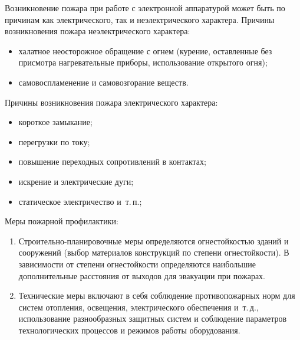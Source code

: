 Возникновение пожара при работе с электронной аппаратурой может быть по причинам как электрического, так и неэлектрического характера.
Причины возникновения пожара неэлектрического характера:
\begin{itemize}
    \item халатное неосторожное обращение с огнем (курение, оставленные без присмотра нагревательные приборы, использование открытого огня);
    \item самовоспламенение и самовозгорание веществ.
\end{itemize}

Причины возникновения пожара электрического характера:
\begin{itemize}
    \item короткое замыкание;
    \item перегрузки по току;
    \item повышение переходных сопротивлений в контактах;
    \item искрение и электрические дуги;
    \item статическое электричество и~т.\,п.;
\end{itemize}

Меры пожарной профилактики:
\begin{enumerate}[leftmargin=0pt,itemindent=\parindent+\labelwidth+\labelsep]
    \item Строительно-планировочные меры определяются огнестойкостью зданий и сооружений (выбор материалов конструкций по степени огнестойкости). 
    В зависимости от степени огнестойкости определяются наибольшие дополнительные расстояния от выходов для эвакуации при пожарах.
    \item Технические меры включают в себя соблюдение противопожарных норм для систем отопления, освещения, электрического обеспечения и~т.\,д., использование разнообразных защитных систем и соблюдение параметров технологических процессов и режимов работы оборудования.
\end{enumerate}

